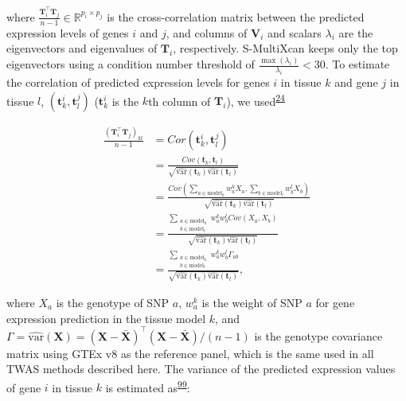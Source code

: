 \documentclass[
  a4paper,
]{article}
\begin{document}
where \(\frac{\mathbf{T}_{i}^{\top} \mathbf{T}_{j}}{n-1} \in \mathbb{R}^{p_i \times p_j}\) is the cross-correlation matrix between the predicted expression levels of genes \(i\) and \(j\),
and columns of \(\mathbf{V}_{i}\) and scalars \(\lambda_i\) are the eigenvectors and eigenvalues of \(\mathbf{T}_{i}\), respectively.
S-MultiXcan keeps only the top eigenvectors using a condition number threshold of \(\frac{\max(\lambda_i)}{\lambda_i} < 30\).
To estimate the correlation of predicted expression levels for genes \(i\) in tissue \(k\) and gene \(j\) in tissue \(l\), \((\mathbf{t}_k^i, \mathbf{t}_l^j)\) (\(\mathbf{t}_k^i\) is the \(k\)th column of \(\mathbf{T}_{i}\)), we used\textsuperscript{\protect\hyperlink{ref-1FFzCXo1s}{24}}

\begin{equation}
\begin{split}
\frac{(\mathbf{T}_{i}^{\top} \mathbf{T}_{j})_{kl}}{n-1} & = Cor(\mathbf{t}_k^i, \mathbf{t}_l^j) \\
  & = \frac{ Cov(\mathbf{t}_k, \mathbf{t}_l) } { \sqrt{\widehat{\mathrm{var}}(\mathbf{t}_k) \widehat{\mathrm{var}}(\mathbf{t}_l)} } \\
  & = \frac{ Cov(\sum_{a \in \mathrm{model}_k} w_a^k X_a, \sum_{b \in \mathrm{model}_l} w_b^l X_b) }  {\sqrt{\widehat{\mathrm{var}}(\mathbf{t}_k) \widehat{\mathrm{var}}(\mathbf{t}_l)} } \\
  & = \frac{ \sum_{\substack{a \in \mathrm{model}_k \\ b \in \mathrm{model}_l}} w_a^k w_b^l Cov(X_a, X_b)} {\sqrt{\widehat{\mathrm{var}}(\mathbf{t}_k) \widehat{\mathrm{var}}(\mathbf{t}_l)} } \\
  & = \frac{ \sum_{\substack{a \in \mathrm{model}_k \\ b \in \mathrm{model}_l}} w_a^k w_b^l \Gamma_{ab}} {\sqrt{\widehat{\mathrm{var}}(\mathbf{t}_k) \widehat{\mathrm{var}}(\mathbf{t}_l)} },
\end{split}
\label{eq:reg:corr_genes}\end{equation}

where \(X_a\) is the genotype of SNP \(a\),
\(w_a^k\) is the weight of SNP \(a\) for gene expression prediction in the tissue model \(k\),
and \(\Gamma = \widehat{\mathrm{var}}(\mathbf{X}) = (\mathbf{X} - \bar{\mathbf{X}})^{\top} (\mathbf{X} - \bar{\mathbf{X}}) / (n-1)\) is the genotype covariance matrix using GTEx v8 as the reference panel, which is the same used in all TWAS methods described here.
The variance of the predicted expression values of gene \(i\) in tissue \(k\) is estimated as\textsuperscript{\protect\hyperlink{ref-vLyTudUB}{99}}:
\end{document}
